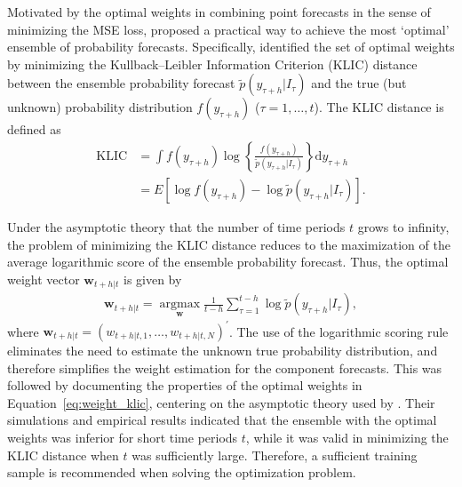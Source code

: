 \documentclass[11pt]{article}
\begin{document}
Motivated by the optimal weights in combining point forecasts in the sense of minimizing the MSE loss, \cite{Hall2007-lh} proposed a practical way to achieve the most `optimal' ensemble of probability forecasts. Specifically, \cite{Hall2007-lh} identified the set of optimal weights by minimizing the Kullback–Leibler Information Criterion (KLIC) distance between the ensemble probability forecast $\tilde{p}(y_{\tau+h}|I_{\tau})$ and the true (but unknown) probability distribution $f(y_{\tau+h})$ ($\tau=1,\ldots,t$). The KLIC distance is defined as
\begin{align*}
\mathrm{KLIC} &= \int f(y_{\tau+h}) \log \left\{\frac{f(y_{\tau+h})}{\tilde{p}(y_{\tau+h}|I_{\tau})}\right\} \mathrm{d} y_{\tau+h} \\
&=E\left[\log f(y_{\tau+h})-\log \tilde{p}(y_{\tau+h}|I_{\tau})\right].
\end{align*}

Under the asymptotic theory that the number of time periods $t$ grows to infinity, the problem of minimizing the KLIC distance reduces to the maximization of the average logarithmic score of the ensemble probability forecast. Thus, the optimal weight vector $\boldsymbol{w}_{t+h|t}$ is given by
\begin{align}
\label{eq:weight_klic}
\boldsymbol{w}_{t+h|t} = \underset{\boldsymbol{w}}{\operatorname{argmax}} \frac{1}{t-h} \sum_{\tau=1}^{t-h} \log \tilde{p}(y_{\tau+h}|I_{\tau}),
\end{align}
where $\boldsymbol{w}_{t+h|t}=\left(w_{t+h|t, 1}, \ldots, w_{t+h|t, N}\right)^{\prime}$. The use of the logarithmic scoring rule eliminates the need to estimate the unknown true probability distribution, and therefore simplifies the weight estimation for the component forecasts. This was followed by \cite{Pauwels2016-ci} documenting the properties of the optimal weights in Equation~\eqref{eq:weight_klic}, centering on the asymptotic theory used by \cite{Hall2007-lh}. Their simulations and empirical results indicated that the ensemble with the optimal weights was inferior for short time periods $t$, while it was valid in minimizing the KLIC distance when $t$ was sufficiently large. Therefore, a sufficient training sample is recommended when solving the optimization problem.
\end{document}
